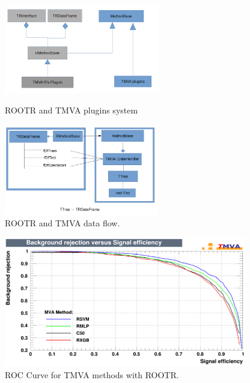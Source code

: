 \documentclass[a4paper]{jpconf}
\begin{document}
\begin{figure}[h]
\centering
\begin{minipage}{15pc}
\includegraphics[width=16pc]{img/rmvaplugins.png}
\caption{\label{rmvaplug}ROOTR and TMVA plugins system}
\end{minipage}\hspace{2pc}%
\begin{minipage}{15pc}
\includegraphics[width=16pc]{img/rmvadf.jpg}
\caption{\label{rmvadf}ROOTR and TMVA data flow.}
\end{minipage}\hspace{2pc}%
\end{figure}

\begin{figure}[h]
\centering
\includegraphics[width=25pc]{img/rmvaroc.png}\caption{\label{rmvaroc} ROC Curve for TMVA methods with ROOTR.}
\end{figure}
\end{document}
